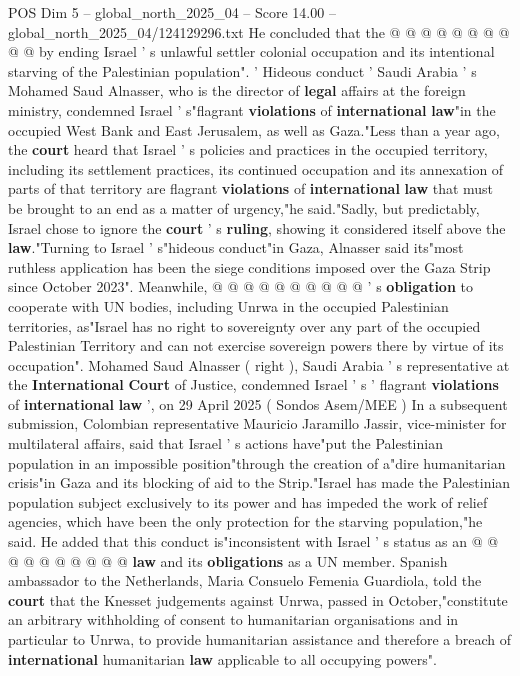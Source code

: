 \begin{textsample}{POS Dim 5 – global\_north\_2025\_04 – Score 14.00 – global\_north\_2025\_04/124129296.txt}
He concluded that the @ @ @ @ @ @ @ @ @ @ by ending Israel ' s unlawful settler colonial occupation and its intentional starving of the Palestinian population". ' Hideous conduct ' Saudi Arabia ' s Mohamed Saud Alnasser, who is the director of \textbf{legal} affairs at the foreign ministry, condemned Israel ' s"flagrant \textbf{violations} of \textbf{international} \textbf{law}"in the occupied West Bank and East Jerusalem, as well as Gaza."Less than a year ago, the \textbf{court} heard that Israel ' s policies and practices in the occupied territory, including its settlement practices, its continued occupation and its annexation of parts of that territory are flagrant \textbf{violations} of \textbf{international} \textbf{law} that must be brought to an end as a matter of urgency,"he said."Sadly, but predictably, Israel chose to ignore the \textbf{court} ' s \textbf{ruling}, showing it considered itself above the \textbf{law}."Turning to Israel ' s"hideous conduct"in Gaza, Alnasser said its"most ruthless application has been the siege conditions imposed over the Gaza Strip since October 2023".
Meanwhile, @ @ @ @ @ @ @ @ @ @ ' s \textbf{obligation} to cooperate with UN bodies, including Unrwa in the occupied Palestinian territories, as"Israel has no right to sovereignty over any part of the occupied Palestinian Territory and can not exercise sovereign powers there by virtue of its occupation".
Mohamed Saud Alnasser ( right ), Saudi Arabia ' s representative at the \textbf{International} \textbf{Court} of Justice, condemned Israel ' s ' flagrant \textbf{violations} of \textbf{international} \textbf{law} ', on 29 April 2025 ( Sondos Asem/MEE ) In a subsequent submission, Colombian representative Mauricio Jaramillo Jassir, vice-minister for multilateral affairs, said that Israel ' s actions have"put the Palestinian population in an impossible position"through the creation of a"dire humanitarian crisis"in Gaza and its blocking of aid to the Strip."Israel has made the Palestinian population subject exclusively to its power and has impeded the work of relief agencies, which have been the only protection for the starving population,"he said.
He added that this conduct is"inconsistent with Israel ' s status as an @ @ @ @ @ @ @ @ @ @ \textbf{law} and its \textbf{obligations} as a UN member.
Spanish ambassador to the Netherlands, Maria Consuelo Femenia Guardiola, told the \textbf{court} that the Knesset judgements against Unrwa, passed in October,"constitute an arbitrary withholding of consent to humanitarian organisations and in particular to Unrwa, to provide humanitarian assistance and therefore a breach of \textbf{international} humanitarian \textbf{law} applicable to all occupying powers".

\end{textsample}
